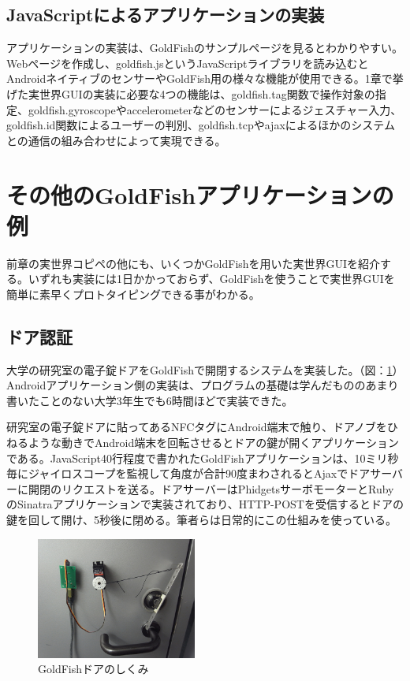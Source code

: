 \subsection{JavaScriptによるアプリケーションの実装}
アプリケーションの実装は、GoldFishのサンプルページ\cite{sample}を見るとわかりやすい。Webページを作成し、goldfish.jsというJavaScriptライブラリを読み込むとAndroidネイティブのセンサーやGoldFish用の様々な機能が使用できる。1章で挙げた実世界GUIの実装に必要な4つの機能は、goldfish.tag関数で操作対象の指定、goldfish.gyroscopeやaccelerometerなどのセンサーによるジェスチャー入力、goldfish.id関数によるユーザーの判別、goldfish.tcpやajaxによるほかのシステムとの通信の組み合わせによって実現できる。


\section{その他のGoldFishアプリケーションの例}
前章の実世界コピペの他にも、いくつかGoldFishを用いた実世界GUIを紹介する。いずれも実装には1日かかっておらず、GoldFishを使うことで実世界GUIを簡単に素早くプロトタイピングできる事がわかる。

\subsection{ドア認証}
大学の研究室の電子錠ドアをGoldFishで開閉するシステムを実装した。（図：\ref{fig:door}）Androidアプリケーション側の実装は、プログラムの基礎は学んだもののあまり書いたことのない大学3年生でも6時間ほどで実装できた。

研究室の電子錠ドアに貼ってあるNFCタグにAndroid端末で触り、ドアノブをひねるような動きでAndroid端末を回転させるとドアの鍵が開くアプリケーションである。JavaScript40行程度で書かれたGoldFishアプリケーションは、10ミリ秒毎にジャイロスコープを監視して角度が合計90度まわされるとAjaxでドアサーバーに開閉のリクエストを送る。ドアサーバーはPhidgetsサーボモーターとRubyのSinatraアプリケーションで実装されており、HTTP-POSTを受信するとドアの鍵を回して開け、5秒後に閉める。筆者らは日常的にこの仕組みを使っている。

\begin{figure}
  \begin{center}
    \includegraphics[height=40mm]{img/door.png}
  \end{center}
  \caption{GoldFishドアのしくみ}
  \label{fig:door}
\end{figure}


